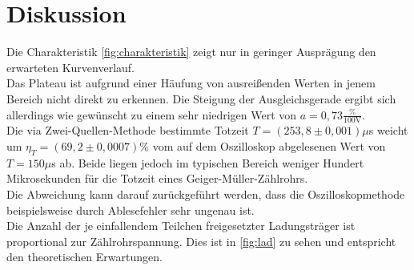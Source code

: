 \section{Diskussion}
\label{sec:Diskussion}

Die Charakteristik \autoref{fig:charakteristik} zeigt nur in geringer Ausprägung den erwarteten 
Kurvenverlauf.\\
Das Plateau ist aufgrund einer Häufung von ausreißenden Werten in jenem Bereich
nicht direkt zu erkennen. Die Steigung der Ausgleichsgerade ergibt sich allerdings wie gewünscht zu einem 
sehr niedrigen Wert von $a = 0,73 \mathrm{\frac{\%}{100 V}}$.\\


Die via Zwei-Quellen-Methode bestimmte Totzeit $T = (253,8 \pm 0,001) \mu$s weicht um 
$\eta_T = (69,2 \pm 0,0007) \% $ vom auf dem Oszilloskop abgelesenen Wert von $T = 150 \mu$s 
ab. 
Beide liegen jedoch im typischen Bereich weniger Hundert Mikrosekunden für die Totzeit eines Geiger-Müller-Zählrohrs.\\
Die Abweichung kann darauf zurückgeführt werden, dass die Oszilloskopmethode
beispielsweise durch Ablesefehler sehr ungenau ist.\\

Die Anzahl der je einfallendem Teilchen freigesetzter Ladungsträger 
ist proportional zur Zählrohrspannung. Dies ist in \autoref{fig:lad} zu sehen und entspricht den
theoretischen Erwartungen.\\